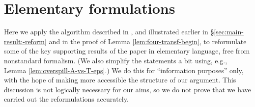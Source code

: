 \appendix
\section{Elementary formulations}\label{sec:elem-form}

Here we apply the algorithm described in \cite[\S2]{MR469763}, and illustrated earlier in \S\ref{sec:main-result:-reform} and in the proof of Lemma \ref{lem:four-transf-begin}, to reformulate some of the key supporting results of the paper in elementary language, free from nonstandard formalism.  (We also simplify the statements a bit using, e.g., Lemma \ref{lem:overspill-A-vs-T-eps}.)  We do this for ``information purposes'' only, with the hope of making more accessible the structure of our argument.  This discussion is not logically necessary for our aims, so we do not prove that we have carried out the reformulations accurately.

